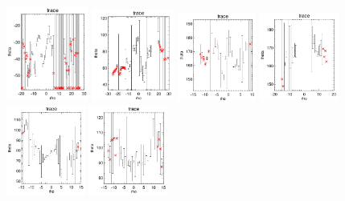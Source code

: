 \documentclass[fleqn,usenatbib]{mnras}
\begin{document}
\begin{figure}
    \includegraphics[width=0.24\textwidth]{Images/trace-plots/trace-plots-cpsb-controls/8716-12704.png}
    \includegraphics[width=0.24\textwidth]{Images/trace-plots/trace-plots-cpsb-controls/8727-12704.png}
    \includegraphics[width=0.23\textwidth]{Images/trace-plots/trace-plots-cpsb-controls/8932-1901.png}
    \includegraphics[width=0.23\textwidth]{Images/trace-plots/trace-plots-cpsb-controls/8932-6103.png}
    \includegraphics[width=0.23\textwidth]{Images/trace-plots/trace-plots-cpsb-controls/8939-3701.png}
    \includegraphics[width=0.23\textwidth]{Images/trace-plots/trace-plots-cpsb-controls/8940-6101.png}    

\end{figure}
\end{document}
